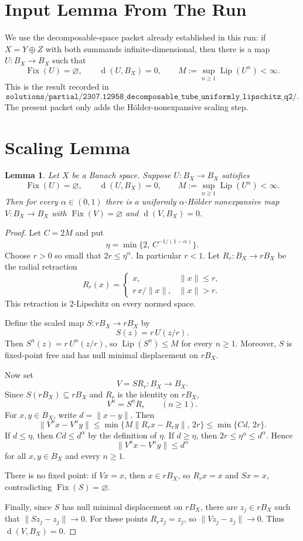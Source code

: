 \documentclass[11pt]{article}
\newtheorem{lemma}{Lemma}
\newcommand{\Fix}{\operatorname{Fix}}
\newcommand{\Lip}{\operatorname{Lip}}
\newcommand{\dist}{\operatorname{d}}
\begin{document}
\section*{Input Lemma From The Run}

We use the decomposable-space packet already established in this run:
if \(X=Y\oplus Z\) with both summands infinite-dimensional, then there is a
map \(U:B_X\to B_X\) such that
\[
  \Fix(U)=\varnothing,\qquad
  \dist(U,B_X)=0,\qquad
  M:=\sup_{n\geq 1}\Lip(U^n)<\infty .
\]
This is the result recorded in
\[
\texttt{solutions/partial/2307.12958\_decomposable\_tube\_uniformly\_lipschitz\_q2/}.
\]
The present packet only adds the H\"older-nonexpansive scaling step.

\section*{Scaling Lemma}

\begin{lemma}
\label{lem:scaling}
Let \(X\) be a Banach space.  Suppose \(U:B_X\to B_X\) satisfies
\[
  \Fix(U)=\varnothing,\qquad
  \dist(U,B_X)=0,\qquad
  M:=\sup_{n\geq 1}\Lip(U^n)<\infty .
\]
Then for every \(\alpha\in(0,1)\) there is a uniformly
\(\alpha\)-H\"older nonexpansive map \(V:B_X\to B_X\) with
\(\Fix(V)=\varnothing\) and \(\dist(V,B_X)=0\).
\end{lemma}

\begin{proof}
Let \(C=2M\) and put
\[
  \eta=\min\{2,\, C^{-1/(1-\alpha)}\}.
\]
Choose \(r>0\) so small that \(2r\leq \eta^\alpha\).  In particular
\(r<1\).  Let \(R_r:B_X\to rB_X\) be the radial retraction
\[
  R_r(x)=
  \begin{cases}
  x,& \|x\|\leq r,\\
  r\,x/\|x\|,& \|x\|>r.
  \end{cases}
\]
This retraction is \(2\)-Lipschitz on every normed space.

Define the scaled map \(S:rB_X\to rB_X\) by
\[
  S(z)=r\,U(z/r).
\]
Then \(S^n(z)=r\,U^n(z/r)\), so \(\Lip(S^n)\leq M\) for every \(n\geq1\).
Moreover, \(S\) is fixed-point free and has null minimal displacement on
\(rB_X\).

Now set
\[
  V=S R_r:B_X\to B_X.
\]
Since \(S(rB_X)\subseteq rB_X\) and \(R_r\) is the identity on \(rB_X\),
\[
  V^n=S^n R_r\qquad(n\geq1).
\]
For \(x,y\in B_X\), write \(d=\|x-y\|\).  Then
\[
  \|V^n x-V^n y\|
  \leq \min\{M\|R_r x-R_r y\|,\,2r\}
  \leq \min\{Cd,\,2r\}.
\]
If \(d\leq \eta\), then \(Cd\leq d^\alpha\) by the definition of \(\eta\).
If \(d\geq\eta\), then \(2r\leq\eta^\alpha\leq d^\alpha\).  Hence
\[
  \|V^n x-V^n y\|\leq d^\alpha
\]
for all \(x,y\in B_X\) and every \(n\geq1\).

There is no fixed point: if \(Vx=x\), then \(x\in rB_X\), so \(R_r x=x\)
and \(Sx=x\), contradicting \(\Fix(S)=\varnothing\).

Finally, since \(S\) has null minimal displacement on \(rB_X\), there are
\(z_j\in rB_X\) such that \(\|S z_j-z_j\|\to0\).  For these points
\(R_r z_j=z_j\), so \(\|V z_j-z_j\|\to0\).  Thus
\(\dist(V,B_X)=0\).
\end{proof}
\end{document}
